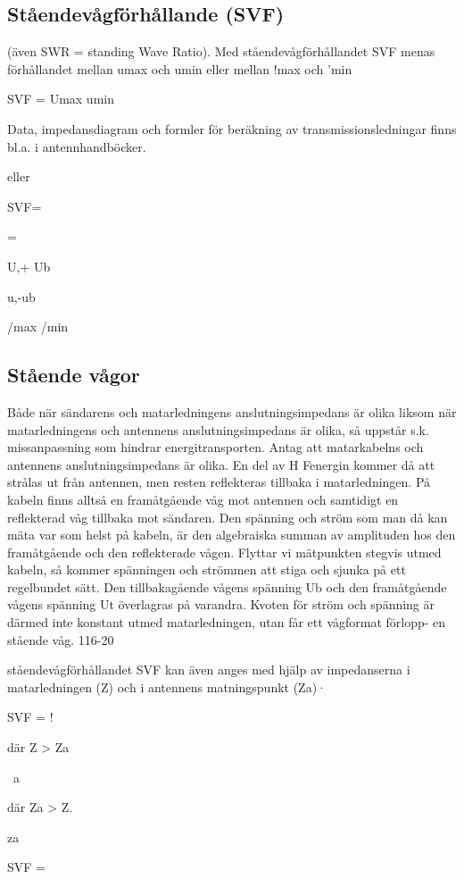 {{\subsection{Ståendevågförhållande (SVF)}

(även SWR = standing Wave Ratio).
Med ståendevågförhållandet SVF menas
förhållandet mellan
umax och umin eller mellan !max och 'min

SVF = Umax
umin

Data, impedansdiagram och formler för
beräkning av transmissionsledningar finns
bl.a. i antennhandböcker.

eller

SVF=

=

U,+ Ub

u,-ub

/max
/min

\subsection{Stående vågor}

Både när sändarens och matarledningens
anslutningsimpedans är olika liksom när
matarledningens och antennens anslutningsimpedans är olika, så uppstår s.k. missanpassning som hindrar energitransporten.
Antag att matarkabelns och antennens
anslutningsimpedans är olika. En del av H Fenergin kommer då att strålas ut från antennen, men resten reflekteras tillbaka i matarledningen. På kabeln finns alltså en framåtgående våg mot antennen och samtidigt en
reflekterad våg tillbaka mot sändaren.
Den spänning och ström som man då
kan mäta var som helst på kabeln, är den
algebraiska summan av amplituden hos den
framåtgående och den reflekterade vågen.
Flyttar vi mätpunkten stegvis utmed kabeln, så kommer spänningen och strömmen
att stiga och sjunka på ett regelbundet sätt.
Den tillbakagående vågens spänning Ub
och den framåtgående vågens spänning Ut
överlagras på varandra. Kvoten för ström
och spänning är därmed inte konstant utmed matarledningen, utan får ett vågformat
förlopp- en stående våg.
116-20

ståendevågförhållandet SVF kan även
anges med hjälp av impedanserna i matarledningen (Z) och i antennens matningspunkt (Za)·

SVF = !

där Z > Za

~a

där Za > Z.

za

SVF =

}}
